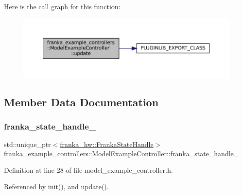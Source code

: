 Here is the call graph for this function\+:
\nopagebreak
\begin{figure}[H]
\begin{center}
\leavevmode
\includegraphics[width=350pt]{classfranka__example__controllers_1_1ModelExampleController_ac80410c22f5e1c98da93ba150a390d2d_cgraph}
\end{center}
\end{figure}


\subsection{Member Data Documentation}
\mbox{\label{classfranka__example__controllers_1_1ModelExampleController_a6619cd4e5d970fde0779dfa8d5da2b71}} 
\subsubsection{\texorpdfstring{franka\+\_\+state\+\_\+handle\+\_\+}{franka\_state\_handle\_}}
{\footnotesize\ttfamily std\+::unique\+\_\+ptr$<$\hyperlink{classfranka__hw_1_1FrankaStateHandle}{franka\+\_\+hw\+::\+Franka\+State\+Handle}$>$ franka\+\_\+example\+\_\+controllers\+::\+Model\+Example\+Controller\+::franka\+\_\+state\+\_\+handle\+\_\+\hspace{0.3cm}{\ttfamily [private]}}



Definition at line 28 of file model\+\_\+example\+\_\+controller.\+h.



Referenced by init(), and update().

